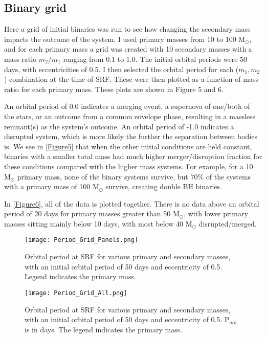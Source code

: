 \documentclass[12pt]{article}
\begin{document}
\pagebreak
\subsection{Binary grid}

Here a grid of initial binaries was run to see how changing the secondary mass impacts the outcome of the system. I used primary masses from $10$ to 100 M$_\odot$, and for each primary mass a grid was created with 10 secondary masses with a mass ratio $m_2 / m_1$ ranging from 0.1 to 1.0. The initial orbital periods were 50 days, with eccentricities of 0.5. I then selected the orbital period for each ($m_1, m_2$) combination at the time of SRF. These were then plotted as a function of mass ratio for each primary mass. These plots are shown in Figure 5 and 6. 

An orbital period of 0.0 indicates a merging event, a supernova of one/both of the stars, or an outcome from a common envelope phase, resulting in a massless remnant(s) as the system's outcome. An orbital period of -1.0 indicates a disrupted system, which is more likely the further the separation between bodies is. We see in \autoref{Figure5} that when the other initial conditions are held constant, binaries with a smaller total mass had much higher merger/disruption fraction for these conditions compared with the higher mass systems. For example, for a 10 M$_\odot$ primary mass, none of the binary systems survive, but 70\% of the systems with a primary mass of 100 M$_\odot$ survive, creating double BH binaries.

In \autoref{Figure6}, all of the data is plotted together. There is no data above an orbital period of 20 days for primary masses greater than 50 M$_\odot$, with lower primary masses sitting mainly below 10 days, with most below 40 M$_\odot$ disrupted/merged.


\begin{figure}
    \centering
    \texttt{[image: Period\_Grid\_Panels.png]}
    \caption{Orbital period at SRF for various primary and secondary masses, with an initial orbital period of 50 days and eccentricity of 0.5. Legend indicates the primary mass.}
    \label{Figure5}
\end{figure}

\begin{figure}
    \centering
    \texttt{[image: Period\_Grid\_All.png]}
    \caption{Orbital period at SRF for various primary and secondary masses, with an initial orbital period of 50 days and eccentricity of 0.5. P$_{orb}$ is in days. The legend indicates the primary mass.}
    \label{Figure6}
\end{figure}
\end{document}
